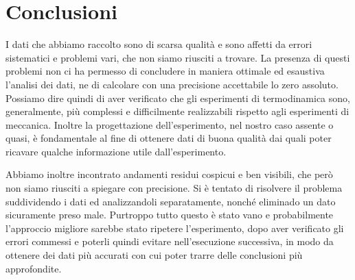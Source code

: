 \section{Conclusioni}

I dati che abbiamo raccolto sono di scarsa qualità e sono affetti da errori sistematici e problemi vari, che non siamo riusciti a trovare.
La presenza di questi problemi non ci ha permesso di concludere in maniera ottimale ed esaustiva l'analisi dei dati, ne di
calcolare con una precisione accettabile lo zero assoluto. Possiamo dire quindi di aver verificato che gli esperimenti di
termodinamica sono, generalmente, più complessi e difficilmente realizzabili rispetto agli esperimenti di meccanica.
Inoltre la progettazione dell'esperimento, nel nostro caso assente o quasi, è fondamentale al fine di ottenere dati di buona
qualità dai quali poter ricavare qualche informazione utile dall'esperimento.

Abbiamo inoltre incontrato andamenti residui cospicui e ben visibili, che però non siamo riusciti a spiegare con precisione.
Si è tentato di risolvere il problema suddividendo i dati ed analizzandoli separatamente, nonché eliminado un dato
sicuramente preso male. Purtroppo tutto questo è stato vano e probabilmente l'approccio migliore sarebbe stato ripetere
l'esperimento, dopo aver verificato gli errori commessi e poterli quindi evitare nell'esecuzione successiva, in modo da ottenere dei dati più accurati con cui poter trarre delle conclusioni più approfondite.


